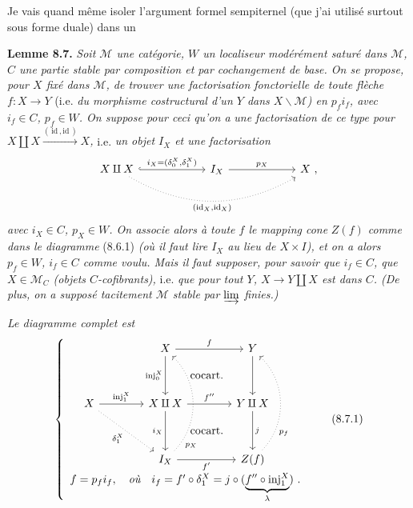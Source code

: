 \documentclass[11pt]{article}
\newcommand{\printedpage}[1]{\marginpar{\footnotesize p.~#1}}
\newcommand{\msp}[1]{\marginpar{\footnotesize [#1]}}
\begin{document}
Je vais quand même isoler l'argument formel sempiternel (que j'ai utilisé surtout sous forme duale) dans un

\textbf{Lemme 8.7.} \textit{Soit $\mathcal{M}$ une catégorie, $W$ un localiseur modérément saturé dans $\mathcal{M}$, $C$ une partie stable par composition et par cochangement de base. On se propose, pour $X$ fixé dans $\mathcal{M}$, de trouver une factorisation fonctorielle de toute flèche $f : X \longrightarrow Y$} (i.e. \textit{du morphisme costructural d'un $Y$ dans $X\backslash\mathcal{M}$) en $p_f i_f$, avec $i_f \in C$, $p_f \in W$. On suppose pour ceci qu'on a}
\msp{page 113}
\textit{une factorisation de ce type pour $X \amalg X \xrightarrow{(\,\mathrm{id}\,,\mathrm{id}\,)} X$,} i.e. \textit{un objet $I_X$ et une factorisation}
\[
\begin{tikzcd}[column sep=6em]
X \amalg X \arrow[r, hook, "{i_X = (\delta_0^X,\delta_1^X)}"] \arrow[rr, dotted, bend right, "{(\mathrm{id}_X,\mathrm{id}_X)}"'] & I_X \arrow[r, "p_X"] & X\ ,
\end{tikzcd}
\]
\textit{avec $i_X \in C$, $p_X \in W$. On associe alors à toute $f$ le mapping cone} \textit{$Z(f)$ comme dans le diagramme} (8.6.1) \textit{(où il faut lire $I_X$ au lieu de $X \times I$), et on a alors $p_f \in W$, $i_f \in C$ comme voulu. Mais il faut supposer, pour savoir que $i_f \in C$, que $X \in \mathcal{M}_C$ (objets $C$-cofibrants),} i.e. \textit{que pour tout $Y$, $X \longrightarrow Y \amalg X$ est dans $C$. (De plus, on a supposé tacitement $\mathcal{M}$ stable par $\varinjlim$ finies.)}

\printedpage{62}

\textit{Le diagramme complet est}
\[
\left\{
\begin{array}{c}
\begin{tikzcd}[ampersand replacement=\&,column sep=4em,row sep=3.5em]
 \& X \arrow[r, "f"] \arrow[d, "\mathrm{inj}_0^X"'] \arrow[dr, phantom, "\text{cocart.}"] \& Y \arrow[d] \\
X \arrow[r, "\mathrm{inj}_1^X"] \arrow[dr, dotted, "\delta_1^X"'] \& X \amalg X \arrow[r, "f''"] \arrow[d, "i_X"'] \arrow[dr, phantom, "\text{cocart.}"] \& Y \amalg X \arrow[d, "j"] \\
 \& I_X \arrow[r, "f'"'] \arrow[uu, dotted, bend right=45, "p_X"{pos=.12,swap}] \& Z(f) \arrow[uu, dotted, bend right=45, "p_f"{pos=.25,swap}]
\end{tikzcd}
\\[1ex]
f = p_f i_f, \quad \textit{où} \quad i_f = f' \circ \delta_1^X = j \circ (\underbrace{f'' \circ \mathrm{inj}_1^X}_{\lambda})\ .
\end{array}
\right.
\tag*{(8.7.1)}
\]
\end{document}
